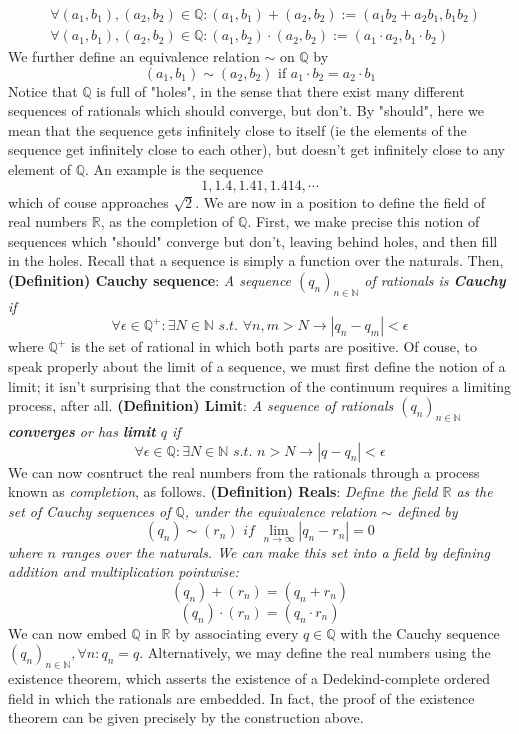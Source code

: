 \documentclass{article}
\newcommand*{\tb}{\textbf}
\newcommand*{\ti}{\textit}
\newcommand*{\nn}{\newline \newline}
\newcommand*{\N}{\mathbb{N}}
\newcommand*{\Q}{\mathbb{Q}}
\newcommand*{\R}{\mathbb{R}}
\newcommand*{\sti}{\textit{ s.t. }}
\begin{document}
    $$ \begin{aligned}
        &\forall (a_1, b_1), (a_2, b_2) \in \Q: (a_1, b_1) + (a_2, b_2) := (a_1 b_2 + a_2 b_1, b_1 b_2) \\
        &\forall (a_1, b_1), (a_2, b_2) \in \Q: (a_1, b_2) \cdot (a_2, b_2) := (a_1 \cdot a_2, b_1 \cdot b_2)
    \end{aligned} $$
We further define an equivalence relation $ \sim $ on $ \Q $ by
    $$ (a_1, b_1) \sim (a_2, b_2) \text{ if } a_1 \cdot b_2 = a_2 \cdot b_1 $$
Notice that $ \Q $ is full of "holes", in the sense that there exist many different sequences of rationals which should converge, but don't. By "should", here we mean that the sequence gets infinitely close to itself (ie the elements of the sequence get infinitely close to each other), but doesn't get infinitely close to any element of $ \Q $. An example is the sequence
    $$ 1, 1.4, 1.41, 1.414, \cdots $$
which of couse approaches $ \sqrt{2} $. We are now in a position to define the field of real numbers $ \R $, as the completion of $ \Q $. First, we make precise this notion of sequences which "should" converge but don't, leaving behind holes, and then fill in the holes. Recall that a sequence is simply a function over the naturals. Then,
\nn
\tb{(Definition) Cauchy sequence}: \ti{A sequence $ ( q_n )_{n \in \N} $ of rationals is \tb{Cauchy} if}
    $$ \forall \epsilon \in \Q^+: \exists N \in \N \sti \forall n, m > N \rightarrow | q_n - q_m | < \epsilon $$
\nn
where $ \Q^+ $ is the set of rational in which both parts are positive. Of couse, to speak properly about the limit of a sequence, we must first define the notion of a limit; it isn't surprising that the construction of the continuum requires a limiting process, after all.
\nn
\tb{(Definition) Limit}: \ti{A sequence of rationals $ ( q_n )_{n \in \N} $ \tb{converges} or has \tb{limit} $ q $ if}
    $$ \forall \epsilon \in \Q: \exists N \in \N \sti n > N \rightarrow | q - q_n | < \epsilon $$
\nn
We can now cosntruct the real numbers from the rationals through a process known as \ti{completion}, as follows.
\nn
\tb{(Definition) Reals}: \ti{Define the field $ \R $ as the set of Cauchy sequences of $ \Q $, under the equivalence relation $ \sim $ defined by}
    $$( q_n ) \sim ( r_n ) \ti{ if } \lim_{n \to \infty} | q_n - r_n | = 0 $$
\indent \ti{where $ n $ ranges over the naturals. We can make this set into a field by defining addition and multiplication pointwise:}
    $$ ( q_n ) + ( r_n ) = ( q_n + r_n ) $$
    $$ ( q_n ) \cdot ( r_n ) = ( q_n \cdot r_n ) $$
We can now embed $ \Q $ in $ \R $ by associating every $ q \in \Q $ with the Cauchy sequence $ ( q_n )_{n \in \N}, \forall n: q_n = q $.
\nn
Alternatively, we may define the real numbers using the existence theorem, which asserts the existence of a Dedekind-complete ordered field in which the rationals are embedded. In fact, the proof of the existence theorem can be given precisely by the construction above.
\end{document}

